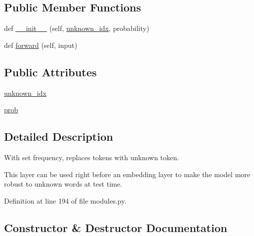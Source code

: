 \subsection*{Public Member Functions}
\begin{DoxyCompactItemize}
\item 
def \hyperlink{classparlai_1_1agents_1_1seq2seq_1_1modules_1_1UnknownDropout_a5952043e80e40861ae67ca548b6e4c23}{\+\_\+\+\_\+init\+\_\+\+\_\+} (self, \hyperlink{classparlai_1_1agents_1_1seq2seq_1_1modules_1_1UnknownDropout_aff31c992c18277c85619d257401c621a}{unknown\+\_\+idx}, probability)
\item 
def \hyperlink{classparlai_1_1agents_1_1seq2seq_1_1modules_1_1UnknownDropout_ae0771638ed591c911178d94cd2bdc59d}{forward} (self, input)
\end{DoxyCompactItemize}
\subsection*{Public Attributes}
\begin{DoxyCompactItemize}
\item 
\hyperlink{classparlai_1_1agents_1_1seq2seq_1_1modules_1_1UnknownDropout_aff31c992c18277c85619d257401c621a}{unknown\+\_\+idx}
\item 
\hyperlink{classparlai_1_1agents_1_1seq2seq_1_1modules_1_1UnknownDropout_a1a265182c039545be63eb24c57bf3251}{prob}
\end{DoxyCompactItemize}


\subsection{Detailed Description}
\begin{DoxyVerb}With set frequency, replaces tokens with unknown token.

This layer can be used right before an embedding layer to make the model
more robust to unknown words at test time.
\end{DoxyVerb}
 

Definition at line 194 of file modules.\+py.



\subsection{Constructor \& Destructor Documentation}
\mbox{\label{classparlai_1_1agents_1_1seq2seq_1_1modules_1_1UnknownDropout_a5952043e80e40861ae67ca548b6e4c23}} 
